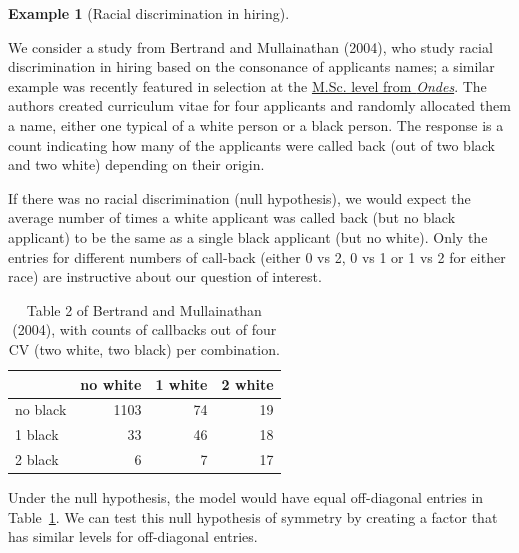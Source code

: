 \documentclass[
  11pt,
  letterpaper,
]{scrbook}
\theoremstyle{definition}
\theoremstyle{definition}
\newtheorem{example}{Example}[chapter]
\theoremstyle{remark}
\begin{document}
\begin{example}[Racial discrimination in
hiring]\protect\hypertarget{exm-racial-chisq}{}\label{exm-racial-chisq}

We consider a study from Bertrand and Mullainathan (2004), who study
racial discrimination in hiring based on the consonance of applicants
names; a similar example was recently featured in selection at the
\href{https://ondes.univ-gustave-eiffel.fr/fileadmin/contributeurs/ONDES/Publications/ONDES_WP_23_01.pdf}{M.Sc.
level from \emph{Ondes}}. The authors created curriculum vitae for four
applicants and randomly allocated them a name, either one typical of a
white person or a black person. The response is a count indicating how
many of the applicants were called back (out of two black and two white)
depending on their origin.

If there was no racial discrimination (null hypothesis), we would expect
the average number of times a white applicant was called back (but no
black applicant) to be the same as a single black applicant (but no
white). Only the entries for different numbers of call-back (either 0 vs
2, 0 vs 1 or 1 vs 2 for either race) are instructive about our question
of interest.

\begin{longtable}[]{@{}lrrr@{}}

\caption{\label{tbl-BM04T2tab}Table 2 of Bertrand and Mullainathan
(2004), with counts of callbacks out of four CV (two white, two black)
per combination.}

\tabularnewline

\toprule\noalign{}
& no white & 1 white & 2 white \\
\midrule\noalign{}
\endhead
\bottomrule\noalign{}
\endlastfoot
no black & 1103 & 74 & 19 \\
1 black & 33 & 46 & 18 \\
2 black & 6 & 7 & 17 \\

\end{longtable}

Under the null hypothesis, the model would have equal off-diagonal
entries in Table~\ref{tbl-BM04T2tab}. We can test this null hypothesis
of symmetry by creating a factor that has similar levels for
off-diagonal entries.


\end{example}
\end{document}
